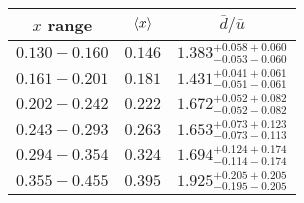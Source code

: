 \begin{tabular}{ccc}
\hline
$x$ range     & $\expval{x}$ & $\bar{d}/\bar{u}$                     \\ \hline
$0.130-0.160$ & $0.146$      & $1.383^{+0.058+0.060}_{-0.053-0.060}$ \\
$0.161-0.201$ & $0.181$      & $1.431^{+0.041+0.061}_{-0.051-0.061}$ \\
$0.202-0.242$ & $0.222$      & $1.672^{+0.052+0.082}_{-0.052-0.082}$ \\
$0.243-0.293$ & $0.263$      & $1.653^{+0.073+0.123}_{-0.073-0.113}$ \\
$0.294-0.354$ & $0.324$      & $1.694^{+0.124+0.174}_{-0.114-0.174}$ \\
$0.355-0.455$ & $0.395$      & $1.925^{+0.205+0.205}_{-0.195-0.205}$ \\ \hline
\end{tabular}
